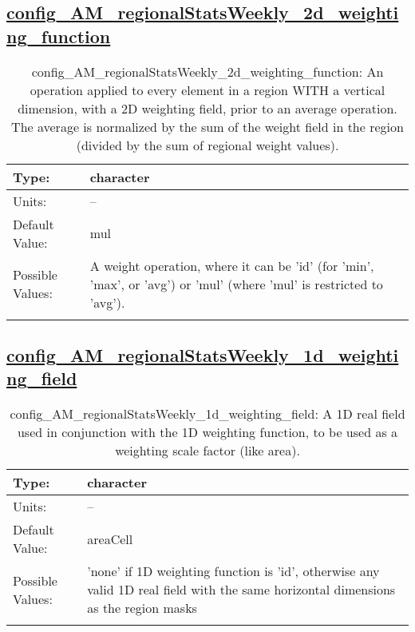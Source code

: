 \subsection[config\_AM\_regionalStatsWeekly\_2d\_weighting\_function]{\hyperref[sec:nm_tab_AM_regionalStatsWeekly]{config\_AM\_regionalStatsWeekly\_2d\_weighting\_function}}
\label{subsec:nm_sec_config_AM_regionalStatsWeekly_2d_weighting_function}
\begin{center}
\begin{longtable}{| p{2.0in} || p{4.0in} |}
    \hline
    Type: & character \\
    \hline
    Units: & -- \\
    \hline
    Default Value: & mul \\
    \hline
    Possible Values: & A weight operation, where it can be 'id' (for 'min', 'max', or 'avg') or 'mul' (where 'mul' is restricted to 'avg'). \\
    \hline
    \caption{config\_AM\_regionalStatsWeekly\_2d\_weighting\_function: An operation applied to every element in a region WITH a vertical dimension, with a 2D weighting field, prior to an average operation. The average is normalized by the sum of the weight field in the region (divided by the sum of regional weight values).}
\end{longtable}
\end{center}
\subsection[config\_AM\_regionalStatsWeekly\_1d\_weighting\_field]{\hyperref[sec:nm_tab_AM_regionalStatsWeekly]{config\_AM\_regionalStatsWeekly\_1d\_weighting\_field}}
\label{subsec:nm_sec_config_AM_regionalStatsWeekly_1d_weighting_field}
\begin{center}
\begin{longtable}{| p{2.0in} || p{4.0in} |}
    \hline
    Type: & character \\
    \hline
    Units: & -- \\
    \hline
    Default Value: & areaCell \\
    \hline
    Possible Values: & 'none' if 1D weighting function is 'id', otherwise any valid 1D real field with the same horizontal dimensions as the region masks \\
    \hline
    \caption{config\_AM\_regionalStatsWeekly\_1d\_weighting\_field: A 1D real field used in conjunction with the 1D weighting function, to be used as a weighting scale factor (like area).}
\end{longtable}
\end{center}
